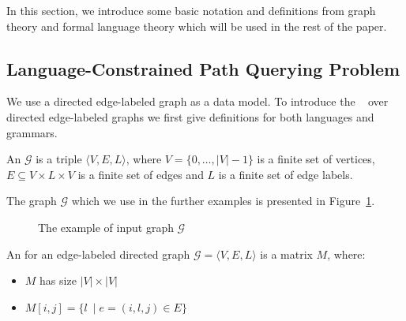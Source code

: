 
In this section, we introduce some basic notation and definitions from graph theory and formal language theory which will be used in the rest of the paper.

\subsection{Language-Constrained Path Querying Problem}

We use a directed edge-labeled graph as a data model.
To introduce the ~\cite{barrett2000formal} over directed edge-labeled graphs we first give definitions for both languages and grammars.

\begin{definition}
An  $\mathcal{G}$ is a triple $\langle V,E,L \rangle$, where $V = \{0, \ldots, |V|-1\}$ is a finite set of vertices, $E \subseteq V \times L \times V$ is a finite set of edges and $L$ is a finite set of edge labels.
\end{definition}

The graph  $\mathcal{G}$  which we use in the further examples is presented in Figure~\ref{fig:example_input_graph}.

\begin{figure}[h!]
    \centering
    \caption{The example of input graph $\mathcal{G}$}
    \label{fig:example_input_graph}
\end{figure}

\begin{definition}
An  for an edge-labeled directed graph $\mathcal{G} = \langle V,E,L \rangle$ is a matrix $M$, where:
\begin{itemize}
    \item $M$ has size $|V|\times|V|$
    \item $M[i,j] = \{l~\mid e = (i,l,j) \in E\}$
\end{itemize}
\end{definition}

